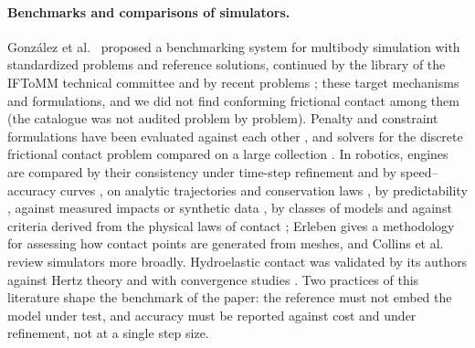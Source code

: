 \paragraph{Benchmarks and comparisons of simulators.} Gonz\'alez et
al.~\cite{Gonzalez2006,Gonzalez2010} proposed a benchmarking system for multibody simulation
with standardized problems and reference solutions, continued by the library of the IFToMM
technical committee \cite{IFToMMBenchmark} and by recent problems \cite{Ruggiu2023}; these
target mechanisms and formulations, and we did not find conforming frictional contact among
them (the catalogue was not audited problem by problem). Penalty and constraint formulations
have been evaluated against each other \cite{Drumwright2011}, and solvers for the discrete
frictional contact problem compared on a large collection \cite{Acary2018}. In robotics,
engines are compared by their consistency under time-step refinement and by speed--accuracy
curves \cite{Erez2015}, on analytic trajectories and conservation laws \cite{SimBenchmark}, by
predictability \cite{Chung2016}, against measured impacts \cite{Fazeli2017,Acosta2022} or
synthetic data \cite{Guo2023}, by classes of models \cite{Horak2019} and against criteria
derived from the physical laws of contact \cite{LeLidec2024}; Erleben \cite{Erleben2018} gives
a methodology for assessing how contact points are generated from meshes, and Collins et
al.~\cite{Collins2021} review simulators more broadly. Hydroelastic contact was validated by
its authors against Hertz theory and with convergence studies
\cite{Elandt2019,Masterjohn2022}. Two practices of this literature shape
the benchmark of the paper: the reference must not embed the model under test, and accuracy
must be reported against cost and under refinement, not at a single step size.
